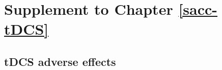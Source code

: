 \documentclass[11pt,english,]{memoir}
\renewcommand{\arraystretch}{1.5} %
\begin{document}
\hypertarget{appendix-appendix}{%
\appendix}


\cleardoublepage
{}
{}
\appendixpage*
\setlength\beforechapskip{-\baselineskip}

\hypertarget{sacc-tDCS-supplement}{%
\chapter{Supplement to Chapter \ref{sacc-tDCS}}\label{sacc-tDCS-supplement}}

\hypertarget{tdcs-adverse-effects}{%
\section{tDCS adverse effects}\label{tdcs-adverse-effects}}

\begingroup
\renewcommand{\arraystretch}{1.25}
\setlength{\LTleft}{-20cm plus -1fill}
\setlength{\LTright}{\LTleft}

\begingroup\fontsize{8}{10}\selectfont
\end{document}
